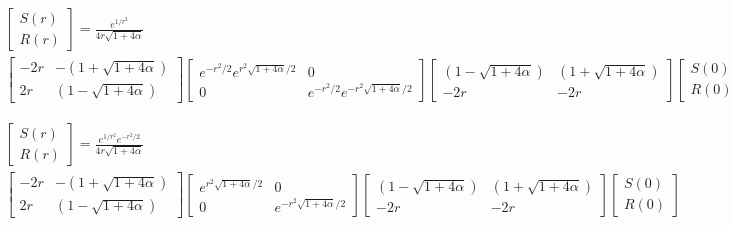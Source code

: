 \documentclass{article}
\begin{document}
\begin{multline*}
\begin{bmatrix}
S(r)\\
R(r)
\end{bmatrix}
= \frac{e^{1/r^{2}}}{ 4r\sqrt{1 + 4\alpha} }\\
\begin{bmatrix}
-2r	&	-\left( 1 + \sqrt{1 + 4\alpha} \right)	\\
2r	&	\left( 1 - \sqrt{1 + 4\alpha} \right)	
\end{bmatrix}
\begin{bmatrix}
e^{-r^{2}/2}e^{r^{2}\sqrt{1 + 4\alpha}/2}	&	0	\\
0	& e^{-r^{2}/2}e^{-r^{2}\sqrt{1 + 4\alpha}/2}
\end{bmatrix}
\begin{bmatrix}
\left( 1 - \sqrt{1 + 4\alpha} \right)	&	\left( 1 + \sqrt{1 + 4\alpha} \right)	\\
-2r										&	-2r	
\end{bmatrix}
\begin{bmatrix}
S(0)\\
R(0)
\end{bmatrix}
\end{multline*}


\begin{multline*}
\begin{bmatrix}
S(r)\\
R(r)
\end{bmatrix}
= \frac{e^{1/r^{2}}e^{-r^{2}/2}}{ 4r\sqrt{1 + 4\alpha} }\\
\begin{bmatrix}
-2r	&	-\left( 1 + \sqrt{1 + 4\alpha} \right)	\\
2r	&	\left( 1 - \sqrt{1 + 4\alpha} \right)	
\end{bmatrix}
\begin{bmatrix}
e^{r^{2}\sqrt{1 + 4\alpha}/2}	&	0	\\
0	& e^{-r^{2}\sqrt{1 + 4\alpha}/2}
\end{bmatrix}
\begin{bmatrix}
\left( 1 - \sqrt{1 + 4\alpha} \right)	&	\left( 1 + \sqrt{1 + 4\alpha} \right)	\\
-2r										&	-2r	
\end{bmatrix}
\begin{bmatrix}
S(0)\\
R(0)
\end{bmatrix}
\end{multline*}
\end{document}

